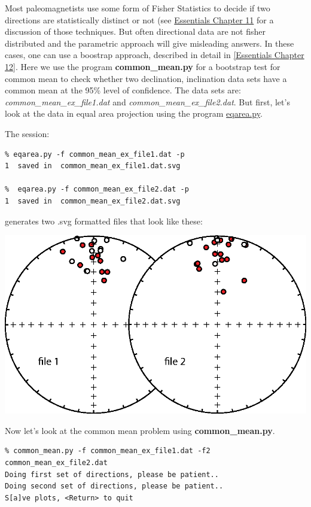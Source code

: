 \documentclass[11pt]{book}
\begin{document}
{{Most paleomagnetists use some form of Fisher Statistics to decide if two directions are statistically distinct or not (see \href{http://earthref.org/MAGIC/books/Tauxe/Essentials/WebBook3ch11.html#ch11}{Essentials Chapter 11} for a discussion of those techniques.  But often directional data are not fisher distributed and the parametric approach will give misleading answers.  In these cases, one can use a boostrap approach, described in detail in \href{http://earthref.org/MAGIC/books/Tauxe/Essentials/WebBook3ch12.html#ch12}{[Essentials Chapter 12]}.  Here we
use the program {\bf common\_mean.py} for a bootstrap test for common mean to check whether two declination, inclination data sets have a common mean at the 95\% level of confidence.    The data sets are: {\it common\_mean\_ex\_file1.dat } and {\it common\_mean\_ex\_file2.dat}.  But first, let's look at the data in equal area projection  using the program \href{#eqarea.py}{eqarea.py}.

The session:
\begin{verbatim}
% eqarea.py -f common_mean_ex_file1.dat -p
1  saved in  common_mean_ex_file1.dat.svg

%  eqarea.py -f common_mean_ex_file2.dat -p
1  saved in  common_mean_ex_file2.dat.svg
\end{verbatim}

\noindent generates two .svg formatted files that look like these:

{%
  \includegraphics[width=15cm]{EPSfiles/common-mean-eq.eps}}

Now let's look at the common mean problem using {\bf common\_mean.py}.

\begin{verbatim}
% common_mean.py -f common_mean_ex_file1.dat -f2 common_mean_ex_file2.dat
Doing first set of directions, please be patient..
Doing second set of directions, please be patient..
S[a]ve plots, <Return> to quit
\end{verbatim}

}}
\end{document}
